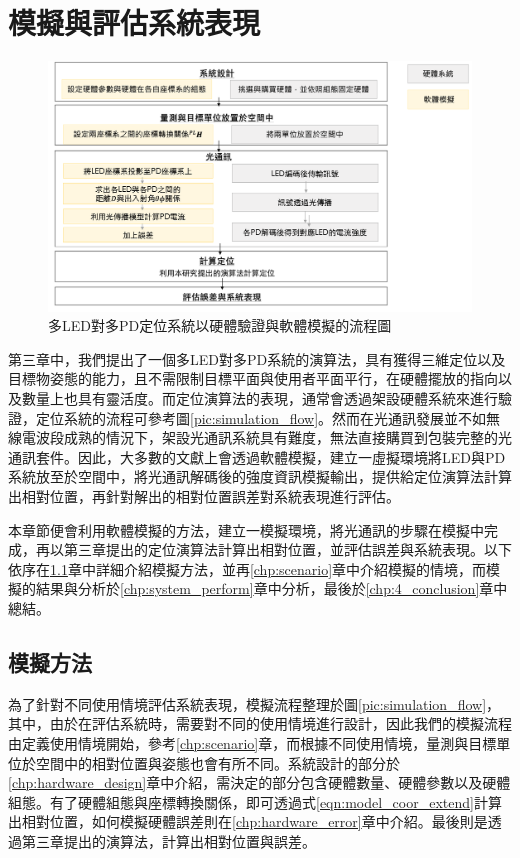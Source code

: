 \chapter{模擬與評估系統表現}
\label{chp:4}

\begin{figure}[ht]
    \centering
    \includegraphics[width=15cm]{ch4pic/simulate_hardware.png}
    \caption{多LED對多PD定位系統以硬體驗證與軟體模擬的流程圖}
    \label{pic:simulate_hardware}
\end{figure}

第三章中，我們提出了一個多LED對多PD系統的演算法，具有獲得三維定位以及目標物姿態的能力，且不需限制目標平面與使用者平面平行，在硬體擺放的指向以及數量上也具有靈活度。而定位演算法的表現，通常會透過架設硬體系統來進行驗證，定位系統的流程可參考圖\ref{pic:simulation_flow}。然而在光通訊發展並不如無線電波段成熟的情況下，架設光通訊系統具有難度，無法直接購買到包裝完整的光通訊套件。因此，大多數的文獻上會透過軟體模擬，建立一虛擬環境將LED與PD系統放至於空間中，將光通訊解碼後的強度資訊模擬輸出，提供給定位演算法計算出相對位置，再針對解出的相對位置誤差對系統表現進行評估。

本章節便會利用軟體模擬的方法，建立一模擬環境，將光通訊的步驟在模擬中完成，再以第三章提出的定位演算法計算出相對位置，並評估誤差與系統表現。以下依序在\ref{chp:simulation}章中詳細介紹模擬方法，並再\ref{chp:scenario}章中介紹模擬的情境，而模擬的結果與分析於\ref{chp:system_perform}章中分析，最後於\ref{chp:4_conclusion}章中總結。

\section{模擬方法}
\label{chp:simulation}

為了針對不同使用情境評估系統表現，模擬流程整理於圖\ref{pic:simulation_flow}，其中，由於在評估系統時，需要對不同的使用情境進行設計，因此我們的模擬流程由定義使用情境開始，參考\ref{chp:scenario}章，而根據不同使用情境，量測與目標單位於空間中的相對位置與姿態也會有所不同。系統設計的部分於\ref{chp:hardware_design}章中介紹，需決定的部分包含硬體數量、硬體參數以及硬體組態。有了硬體組態與座標轉換關係，即可透過式\ref{eqn:model_coor_extend}計算出相對位置，如何模擬硬體誤差則在\ref{chp:hardware_error}章中介紹。最後則是透過第三章提出的演算法，計算出相對位置與誤差。


